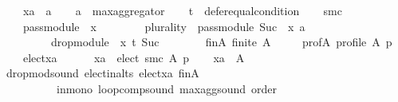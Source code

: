 \begin{isabellebody}
\ \ \ \ xa\ {\isacharcolon}{\kern0pt}{\isacharcolon}{\kern0pt}\ {\isachardoublequoteopen}{\isacharprime}{\kern0pt}a{\isachardoublequoteclose}\isanewline
\ \ \isamarkupfalse%
\ {\isacharquery}{\kern0pt}a\ {\isacharequal}{\kern0pt}\ {\isachardoublequoteopen}max{\isacharunderscore}{\kern0pt}aggregator{\isachardoublequoteclose}\isanewline
\ \ \isamarkupfalse%
\ {\isacharquery}{\kern0pt}t\ {\isacharequal}{\kern0pt}\ {\isachardoublequoteopen}defer{\isacharunderscore}{\kern0pt}equal{\isacharunderscore}{\kern0pt}condition{\isachardoublequoteclose}\isanewline
\ \ \isamarkupfalse%
\ {\isacharquery}{\kern0pt}smc\ {\isacharequal}{\kern0pt}\isanewline
\ \ \ \ {\isachardoublequoteopen}pass{\isacharunderscore}{\kern0pt}module\ {}\ x\ {\isasymtriangleright}\isanewline
\ \ \ \ \ \ \ {\isacharparenleft}{\kern0pt}{\isacharparenleft}{\kern0pt}plurality{\isasymdown}{\isacharparenright}{\kern0pt}\ {\isasymtriangleright}\ pass{\isacharunderscore}{\kern0pt}module\ {\isacharparenleft}{\kern0pt}Suc\ {}{\isacharparenright}{\kern0pt}\ x{\isacharparenright}{\kern0pt}\ {\isasymparallel}\isactrlsub {\isacharquery}{\kern0pt}a\isanewline
\ \ \ \ \ \ \ \ \ drop{\isacharunderscore}{\kern0pt}module\ {}\ x\ {\isasymcirclearrowleft}\isactrlsub {\isacharquery}{\kern0pt}t\ {\isacharparenleft}{\kern0pt}Suc\ {}{\isacharparenright}{\kern0pt}{\isachardoublequoteclose}\isanewline
\ \ \isamarkupfalse%
\isanewline
\ \ \ \ fin{\isacharunderscore}{\kern0pt}A{\isacharcolon}{\kern0pt}\ {\isachardoublequoteopen}finite\ A{\isachardoublequoteclose}\ \isanewline
\ \ \ \ prof{\isacharunderscore}{\kern0pt}A{\isacharcolon}{\kern0pt}\ {\isachardoublequoteopen}profile\ A\ p{\isachardoublequoteclose}\ \isanewline
\ \ \ \ elect{\isacharunderscore}{\kern0pt}xa{\isacharcolon}{\kern0pt}\isanewline
\ \ \ \ \ \ {\isachardoublequoteopen}xa\ {\isasymin}\ elect\ {\isacharparenleft}{\kern0pt}{\isacharquery}{\kern0pt}smc{\isacharparenright}{\kern0pt}\ A\ p{\isachardoublequoteclose}\isanewline
\ \ \isamarkupfalse%
\ {\isachardoublequoteopen}xa\ {\isasymin}\ A{\isachardoublequoteclose}\isanewline
\ \ \ \ \isamarkupfalse%
\ drop{\isacharunderscore}{\kern0pt}mod{\isacharunderscore}{\kern0pt}sound\ elect{\isacharunderscore}{\kern0pt}in{\isacharunderscore}{\kern0pt}alts\ elect{\isacharunderscore}{\kern0pt}xa\ fin{\isacharunderscore}{\kern0pt}A\isanewline
\ \ \ \ \ \ \ \ \ \ in{\isacharunderscore}{\kern0pt}mono\ loop{\isacharunderscore}{\kern0pt}comp{\isacharunderscore}{\kern0pt}sound\ max{\isacharunderscore}{\kern0pt}agg{\isacharunderscore}{\kern0pt}sound\ order\isanewline

\end{isabellebody}
